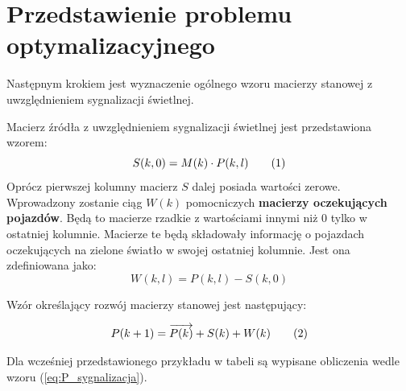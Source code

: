 \documentclass[12pt]{book}
\newcommand\addtag{\refstepcounter{equation}
\renewcommand{\labelenumii}{\theenumii}
\renewcommand{\theenumii}{\theenumi.\arabic{enumii}.}
\tag{\theequation}}
\begin{document}
\section{Przedstawienie problemu optymalizacyjnego}
Następnym krokiem jest wyznaczenie ogólnego wzoru macierzy stanowej z uwzględnieniem sygnalizacji świetlnej. 
\begin{tcolorbox}
Macierz źródła z uwzględnieniem sygnalizacji świetlnej jest przedstawiona wzorem:
\[S(k,0)=M(k) \cdot P(k,l) \addtag \label{eq:S} \]
Oprócz pierwszej kolumny macierz $S$ dalej posiada wartości zerowe.\\
Wprowadzony zostanie ciąg $W(k)$ pomocniczych \textbf{macierzy oczekujących pojazdów}. Będą to macierze rzadkie z wartościami innymi niż 0 tylko w ostatniej kolumnie. Macierze te będą składowały informację o pojazdach oczekujących na zielone światło w swojej ostatniej kolumnie. Jest ona zdefiniowana jako:
\[W(k,l)=P(k,l)-S(k,0)\]

Wzór określający rozwój macierzy stanowej jest następujący:

\[P(k+1)=\overrightarrow{P(k)} + S(k) + W(k) \addtag \label{eq:P_sygnalizacja}\]
\end{tcolorbox}
\newpage 
Dla wcześniej przedstawionego przykładu w tabeli są wypisane obliczenia wedle wzoru (\ref{eq:P_sygnalizacja}).

\def \PZero { $\begin{bmatrix}
0 & 1 & 0 & \textbf{1}  \\
0 & 1 & 0 & 1  \\
1 & 0 & 0 & 0  
\end{bmatrix}$
}
\def \PmovedZero {
$\begin{bmatrix}
0 & 0 & 1 & 0  \\
0 & 0 & 1 & 0  \\
0 & 1 & 0 & 0  
\end{bmatrix}$
}
\def \SZero {
$\begin{bmatrix}
1 \\
0 \\
0   
\end{bmatrix}$

}
\def \WZero {
$\begin{bmatrix}
0  \\
1  \\
0  
\end{bmatrix}$
}
\def \MZero {$\begin{bmatrix}
  0 & 0 & 0 \\
       0 & 0 & 0\\
       1 & 0 & 0 \\
\end{bmatrix}$}
\end{document}
